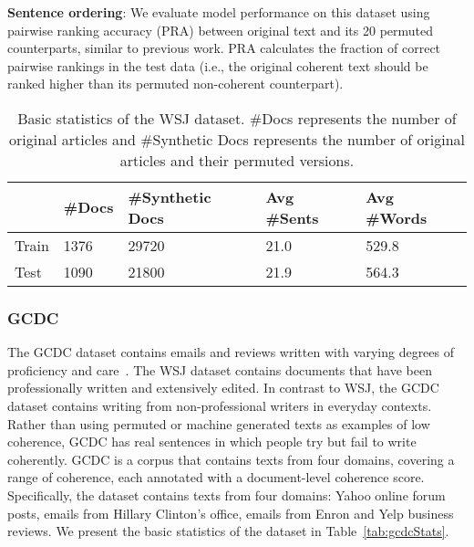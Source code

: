 \documentclass[11pt]{article}
\begin{document}
\noindent\textbf{Sentence ordering}: We evaluate model performance on this dataset using pairwise ranking accuracy (PRA) between original text and its 20 permuted counterparts, similar to previous work. PRA calculates the fraction of correct pairwise rankings in the test data (i.e., the original coherent text should be ranked higher than its permuted non-coherent counterpart).  

\setlength{\tabcolsep}{4pt}
\begin{table}
    \centering
    \scriptsize
    \begin{tabular}{|l|l|l|l|l|}
\hline
&\#Docs&\#Synthetic Docs&Avg \#Sents&Avg \#Words\\
\hline
Train&1376&29720&21.0&529.8\\
\hline
Test&1090&21800&21.9&564.3\\
\hline
\end{tabular}
    \caption{Basic statistics of the WSJ dataset. \#Docs represents the number of original articles and \#Synthetic Docs represents the number of original articles and their permuted versions.}
    \label{tab:wsjStats}
\end{table}

\subsubsection{GCDC}
The GCDC dataset contains emails and reviews written with varying degrees of proficiency and care~\cite{lai2018discourse}. The WSJ dataset contains documents that have been professionally written and extensively edited. In contrast to WSJ, the GCDC dataset contains writing from non-professional writers in everyday contexts. Rather than using permuted or machine generated texts as examples of low coherence, GCDC has real sentences in which people try but fail to write coherently. GCDC is a corpus that contains texts from four domains, covering a range of coherence, each annotated with a document-level coherence score. Specifically, the dataset contains texts from four domains: Yahoo online forum posts, emails from Hillary Clinton's office, emails from Enron and Yelp business reviews.  We present the basic statistics of the dataset in Table~\ref{tab:gcdcStats}.
\end{document}
